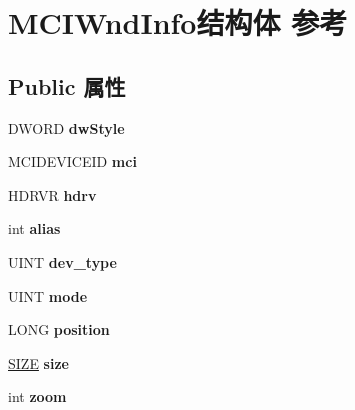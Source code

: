 \hypertarget{struct_m_c_i_wnd_info}{}\section{M\+C\+I\+Wnd\+Info结构体 参考}
\label{struct_m_c_i_wnd_info}
\subsection*{Public 属性}
\begin{DoxyCompactItemize}
\item 
\mbox{\label{struct_m_c_i_wnd_info_afab1f69439f86a21b5e14bcf9a9b71c9}} 
D\+W\+O\+RD {\bfseries dw\+Style}
\item 
\mbox{\label{struct_m_c_i_wnd_info_a158052d76825e18a1fd7ca87d0490e4c}} 
M\+C\+I\+D\+E\+V\+I\+C\+E\+ID {\bfseries mci}
\item 
\mbox{\label{struct_m_c_i_wnd_info_ac0d356d283714538d41157ce2143a4ec}} 
H\+D\+R\+VR {\bfseries hdrv}
\item 
\mbox{\label{struct_m_c_i_wnd_info_ab75e9f138828194ef90cff7b1a2f165f}} 
int {\bfseries alias}
\item 
\mbox{\label{struct_m_c_i_wnd_info_ad8e903d9d8e331d3ad6badc4ad0067d8}} 
U\+I\+NT {\bfseries dev\+\_\+type}
\item 
\mbox{\label{struct_m_c_i_wnd_info_a40861ff35b4893bcb869c44cbfb7a494}} 
U\+I\+NT {\bfseries mode}
\item 
\mbox{\label{struct_m_c_i_wnd_info_a8864cedc941f8482cbdf5db3b84088e8}} 
L\+O\+NG {\bfseries position}
\item 
\mbox{\label{struct_m_c_i_wnd_info_a5175fe7ad21208deaf2fd88acaa2a879}} 
\hyperlink{structtag_s_i_z_e}{S\+I\+ZE} {\bfseries size}
\item 
\mbox{\label{struct_m_c_i_wnd_info_ae9ee619f34f73725658200c654a4c65e}} 
int {\bfseries zoom}
\item 

\end{DoxyCompactItemize}
